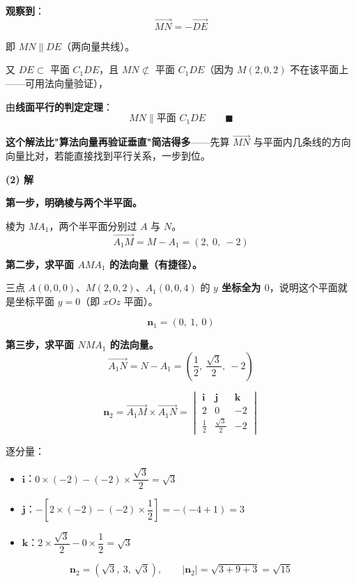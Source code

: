 \textbf{观察到}：
\[\overrightarrow{MN}=-\overrightarrow{DE}\]

即 \textbf{$MN\parallel DE$}（两向量共线）。

又 $DE\subset$ 平面 $C_1DE$，且 $MN\not\subset$ 平面 $C_1DE$（因为 $M(2,0,2)$ 不在该平面上——可用法向量验证），

由\textbf{线面平行的判定定理}：
\[MN\parallel\text{平面 }C_1DE\qquad\blacksquare\]

\begin{gktip}
\textbf{这个解法比"算法向量再验证垂直"简洁得多}——先算 $\overrightarrow{MN}$ 与平面内几条线的方向向量比对，若能直接找到平行关系，一步到位。
\end{gktip}

\par\medskip

\textbf{(2) 解}

\textbf{第一步，明确棱与两个半平面。}

棱为 $MA_1$，两个半平面分别过 $A$ 与 $N$。
\[\overrightarrow{A_1M}=M-A_1=(2,\ 0,\ -2)\]

\textbf{第二步，求平面 $AMA_1$ 的法向量（有捷径）。}

三点 $A(0,0,0)$、$M(2,0,2)$、$A_1(0,0,4)$ 的 \textbf{$y$ 坐标全为 $0$}，说明这个平面就是坐标平面 $y=0$（即 $xOz$ 平面）。

\[\boldsymbol n_1=(0,\ 1,\ 0)\]

\textbf{第三步，求平面 $NMA_1$ 的法向量。}
\[\overrightarrow{A_1N}=N-A_1=\left(\frac12,\ \frac{\sqrt3}2,\ -2\right)\]

\[\boldsymbol n_2=\overrightarrow{A_1M}\times\overrightarrow{A_1N}=\begin{vmatrix}\boldsymbol i&\boldsymbol j&\boldsymbol k\\ 2&0&-2\\ \frac12&\frac{\sqrt3}2&-2\end{vmatrix}\]

逐分量：
\begin{itemize}
\item $\boldsymbol i$：$0\times(-2)-(-2)\times\dfrac{\sqrt3}2=\sqrt3$
\item $\boldsymbol j$：$-\left[2\times(-2)-(-2)\times\dfrac12\right]=-(-4+1)=3$
\item $\boldsymbol k$：$2\times\dfrac{\sqrt3}2-0\times\dfrac12=\sqrt3$
\end{itemize}

\[\boldsymbol n_2=\left(\sqrt3,\ 3,\ \sqrt3\right),\qquad \left|\boldsymbol n_2\right|=\sqrt{3+9+3}=\sqrt{15}\]

